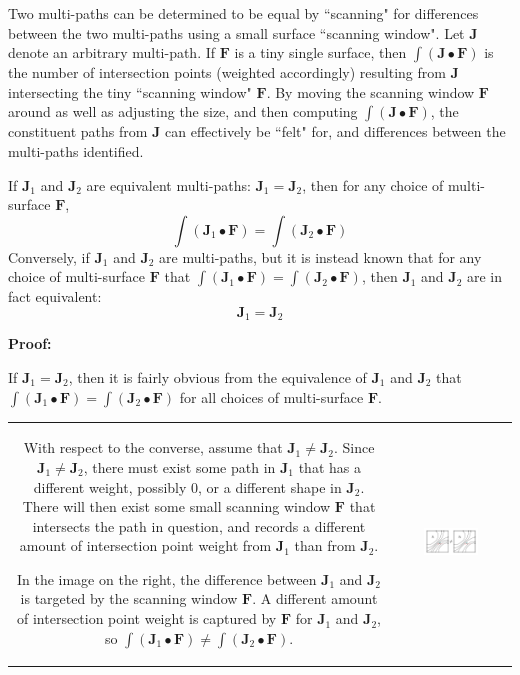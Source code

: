 Two multi-paths can be determined to be equal by ``scanning" for differences between the two multi-paths using a small surface ``scanning window". Let \(\mathbf{J}\) denote an arbitrary multi-path. If \(\mathbf{F}\) is a tiny single surface, then \(\int (\mathbf{J} \bullet \mathbf{F})\) is the number of intersection points (weighted accordingly) resulting from \(\mathbf{J}\) intersecting the tiny ``scanning window" \(\mathbf{F}\). By moving the scanning window \(\mathbf{F}\) around as well as adjusting the size, and then computing \(\int (\mathbf{J} \bullet \mathbf{F})\), the constituent paths from \(\mathbf{J}\) can effectively be ``felt" for, and differences between the multi-paths identified.  

\begin{thm}
If \(\mathbf{J}_1\) and \(\mathbf{J}_2\) are equivalent multi-paths: \(\mathbf{J}_1 = \mathbf{J}_2\), then for any choice of multi-surface \(\mathbf{F}\), 
\[\int (\mathbf{J}_1 \bullet \mathbf{F}) = \int (\mathbf{J}_2 \bullet \mathbf{F})\]
Conversely, if \(\mathbf{J}_1\) and \(\mathbf{J}_2\) are multi-paths, but it is instead known that for any choice of multi-surface \(\mathbf{F}\) that 
\(\int (\mathbf{J}_1 \bullet \mathbf{F}) = \int (\mathbf{J}_2 \bullet \mathbf{F})\), then \(\mathbf{J}_1\) and \(\mathbf{J}_2\) are in fact equivalent:
\[\mathbf{J}_1 = \mathbf{J}_2\]  
\end{thm}
\textbf{Proof:}

If \(\mathbf{J}_1 = \mathbf{J}_2\), then it is fairly obvious from the equivalence of \(\mathbf{J}_1\) and \(\mathbf{J}_2\) that \(\int (\mathbf{J}_1 \bullet \mathbf{F}) = \int (\mathbf{J}_2  \bullet \mathbf{F})\) for all choices of multi-surface \(\mathbf{F}\). 

\vspace{5mm}

\begin{tabular}{cc}
\parbox{0.5\textwidth}{
With respect to the converse, assume that \(\mathbf{J}_1 \neq \mathbf{J}_2\). Since \(\mathbf{J}_1 \neq \mathbf{J}_2\), there must exist some path in \(\mathbf{J}_1\) that has a different weight, possibly \(0\), or a different shape in \(\mathbf{J}_2\). There will then exist some small scanning window \(\mathbf{F}\) that intersects the path in question, and records a different amount of intersection point weight from \(\mathbf{J}_1\) than from \(\mathbf{J}_2\).

In the image on the right, the difference between \(\mathbf{J}_1\) and \(\mathbf{J}_2\) is targeted by the scanning window \(\mathbf{F}\). A different amount of intersection point weight is captured by \(\mathbf{F}\) for \(\mathbf{J}_1\) and \(\mathbf{J}_2\), so \(\int (\mathbf{J}_1 \bullet \mathbf{F}) \neq \int (\mathbf{J}_2 \bullet \mathbf{F})\).
} & \parbox{0.5\textwidth}{
\includegraphics[width = 0.5\textwidth]{Point_totals/scanning_paths_using_surfaces}
}
\end{tabular}

